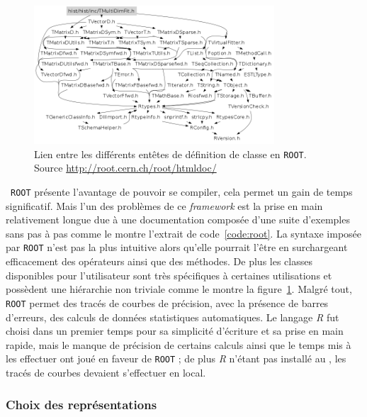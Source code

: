 	

	\begin{figure}[h]
		\centering
		\includegraphics[width=0.8\textwidth]{img/linkroot.png}
		\caption[Lien entre les définitions de classes dans \texttt{ROOT}]{Lien entre les différents entêtes de définition de classe en \texttt{ROOT}. Source \url{http://root.cern.ch/root/htmldoc/}}
		\label{fig:linkroot}
	\end{figure}

\
\texttt{ROOT} présente l'avantage de pouvoir se compiler, cela permet un gain de temps significatif. Mais l'un des problèmes de ce \emph{framework} est la prise en main relativement longue due à une documentation composée d'une suite d'exemples sans pas à pas comme le montre l'extrait de code~\ref{code:root}. La syntaxe imposée par \texttt{ROOT} n'est pas la plus intuitive alors qu'elle pourrait l'être en surchargeant efficacement des opérateurs ainsi que des méthodes. De plus les classes disponibles pour l'utilisateur sont très spécifiques à certaines utilisations et possèdent une hiérarchie non triviale comme le montre la figure~\ref{fig:linkroot}. Malgré tout, \texttt{ROOT} permet des tracés de courbes de précision, avec la présence de barres d'erreurs, des calculs de données statistiques automatiques. Le langage \emph{R} fut choisi dans un premier temps pour sa simplicité d'écriture et sa prise en main rapide, mais le manque de précision de certains calculs ainsi que le temps mis à les effectuer ont joué en faveur de \texttt{ROOT} ; de plus \emph{R} n'étant pas installé au \CC{}, les tracés de courbes devaient s'effectuer en local.

		\subsubsection{Choix des représentations}

